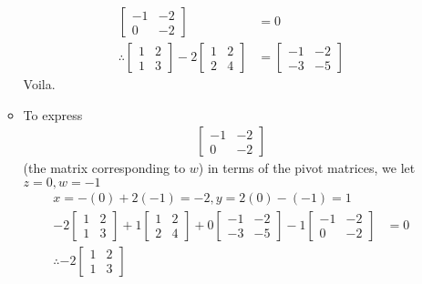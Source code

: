 \begin{itemize}
\begin{itemize}
\begin{align*}
\begin{bmatrix}
            -1 & -2\\ 0 & -2
          \end{bmatrix}
          &= 0
          \\ \therefore
          \begin{bmatrix}
            1 & 2\\ 1 & 3
          \end{bmatrix}
          - 2 \begin{bmatrix}
            1 & 2\\ 2 & 4
          \end{bmatrix}
          &=
          \begin{bmatrix}
            -1 & -2\\ -3 & -5
          \end{bmatrix}
        \end{align*}
        Voila.
      \item To express
        \begin{align*}
          \begin{bmatrix}
            -1 & -2\\ 0 & -2
          \end{bmatrix}
        \end{align*}
        (the matrix corresponding to $w$) in terms of the pivot matrices, we let $z = 0, w = -1$
        \begin{align*}
          x = -(0) + 2(-1) = -2, y = 2(0) - (-1) = 1\\
          -2 \begin{bmatrix}
            1 & 2\\ 1 & 3
          \end{bmatrix}
          + 1 \begin{bmatrix}
            1 & 2\\ 2 & 4
          \end{bmatrix}
          + 0 \begin{bmatrix}
            -1 & -2\\ -3 & -5
          \end{bmatrix}
          - 1 \begin{bmatrix}
            -1 & -2\\ 0 & -2
          \end{bmatrix}
          &= 0
          \\ \therefore
          -2 \begin{bmatrix}
            1 & 2\\ 1 & 3
          \end{bmatrix}

\end{align*}
\end{itemize}
\end{itemize}
